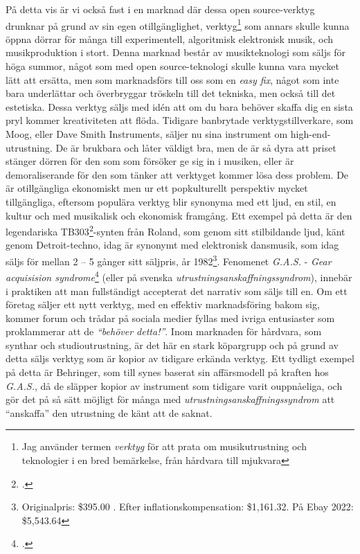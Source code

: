 \documentclass{article}
\begin{document}
På detta vis är vi också fast i en marknad där dessa open source-verktyg drunknar på grund av sin egen
otillgänglighet, verktyg\footnote{Jag använder termen \emph{verktyg} för att prata om musikutrustning och
teknologier i en bred bemärkelse, från hårdvara till mjukvara} som annars skulle kunna öppna dörrar för många
till experimentell, algoritmisk elektronisk musik, och musikproduktion i stort. Denna marknad består av
musikteknologi som säljs för höga summor, något som med open source-teknologi skulle kunna vara mycket lätt
att ersätta, men som marknadsförs till oss som en \emph{easy fix}, något som inte bara underlättar och överbryggar
tröskeln till det tekniska, men också till det estetiska. Dessa verktyg säljs med idén att om du bara behöver
skaffa dig en sista pryl kommer kreativiteten att flöda. Tidigare banbrytade verktygstillverkare, som
Moog, eller Dave Smith Instruments, säljer nu sina instrument om high-end-utrustning. De är brukbara och låter
väldigt bra, men de är så dyra att priset stänger dörren för den som som försöker ge sig in i musiken, eller
är demoraliserande för den som tänker att verktyget kommer lösa dess problem. De är otillgängliga ekonomiskt
men ur ett popkulturellt perspektiv mycket tillgängliga, eftersom populära verktyg blir synonyma med ett ljud,
en stil, en kultur och med musikalisk och ekonomisk framgång. Ett exempel på detta är den legendariska
TB303\footcite{303}-synten från Roland, som genom sitt
stilbildande ljud, känt genom Detroit-techno, idag är synonymt med elektronisk dansmusik, som idag säljs för
mellan 2 -- 5 gånger sitt säljpris, år 1982\footnote{Originalpris: \$395.00 . Efter inflationskompensation:
\$1,161.32. På Ebay 2022: \$5,543.64}. Fenomenet \emph{G.A.S.} - \emph{Gear acquisision syndrome}\footcite{gas}
(eller på svenska \emph{utrustningsanskaffningssyndrom}), innebär i praktiken att man fullständigt
accepterat det narrativ som säljs till en. Om ett företag säljer ett nytt verktyg, med en effektiv
marknadsföring bakom sig, kommer forum och trådar på sociala medier fyllas med ivriga entusiaster som
proklammerar att de \emph{``behöver detta!''}. Inom marknaden för hårdvara, som synthar och studioutrustning,
är det här en stark köpargrupp och på grund av detta säljs
verktyg som är kopior av tidigare erkända verktyg. Ett tydligt exempel på detta är Behringer, som till synes
baserat sin affärsmodell på kraften hos \emph{G.A.S.}, då de släpper kopior av instrument som tidigare varit
ouppnåeliga, och gör det på så sätt möjligt för många med \emph{utrustningsanskaffningssyndrom} att
``anskaffa'' den utrustning de känt att de saknat.
\end{document}

